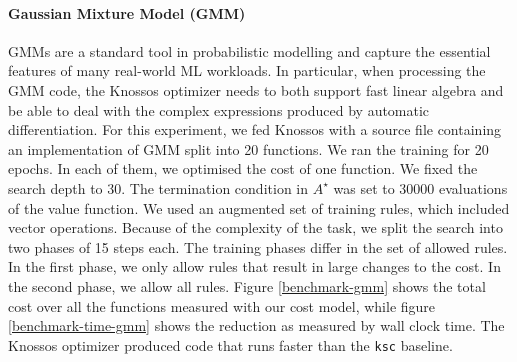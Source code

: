 \documentclass[fullpage,twocolumn]{article} %
\begin{document}
\paragraph{Gaussian Mixture Model (GMM)}
GMMs are a standard tool in probabilistic modelling and capture the essential features of many real-world ML workloads. In particular, when processing the GMM code, the Knossos optimizer needs to both support fast linear algebra and be able to deal with the complex expressions produced by automatic differentiation. For this experiment, we fed Knossos with a source file containing an implementation of GMM split into 20 functions. We ran the training for 20 epochs. In each of them, we optimised the cost of one function. We fixed the search depth to 30. The termination condition in $A^\star$ was set to 30000 evaluations of the value function. We used an augmented set of training rules, which included vector operations. Because of the complexity of the task, we split the search into two phases of 15 steps each. The training phases differ in the set of allowed rules. In the first phase, we only allow rules that result in large changes to the cost. In the second phase, we allow all rules.  Figure \ref{benchmark-gmm} shows the total cost over all the functions measured with our cost model, while figure \ref{benchmark-time-gmm} shows the reduction as measured by wall clock time. The Knossos optimizer produced code that runs faster than the \texttt{ksc} baseline.

\end{document}
